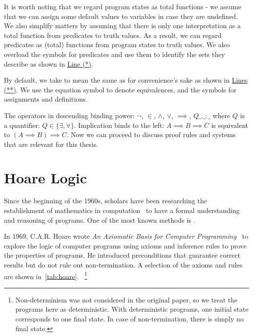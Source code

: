 It is worth noting that we regard program states as total functions - we assume that we can assign some default values to variables in case they are undefined. 
We also simplify matters by assuming that there is only one interpretation as a total function from predicates to truth values. 
As a result, we can regard predicates as (total) functions from program states to truth values. 
We also overload the symbols for predicates and use them to identify the sets they describe as shown in \hyperlink{2.*}{Line (*)}. 

By default, we take  to mean the same as  for convenience's sake as shown in \hyperlink{2.**}{Lines (**)}. 
We use the equation symbol \mathl{=} to denote equivalences, and the symbols \mathl{:=} for assignments and definitions. 

The operators in descending binding power: $\neg$, $\in$, $\wedge$, $\vee$, ${\implies}$, $Q\_.\_:\_$ where $Q$ is a quantifier: $Q\in\{\exists, \forall\}$. Implication binds to the left: $A{\implies} B{\implies} C$ is equivalent to $(A{\implies} B){\implies} C$.
Now we can proceed to discuss proof rules and systems that are relevant for this thesis. 




\section{Hoare Logic}\label{sec:hoare}
Since the beginning of the 1960s, scholars have been researching the establishment of mathematics in computation~\cite{floyd93, mccarthy93} to have a formal understanding and reasoning of programs. 
One of the most known methods is . 

In 1969, C.A.R. Hoare wrote \textit{An Axiomatic Basis for Computer Programming}~\cite{hoare69} to explore the logic of computer programs using axioms and inference rules to prove the properties of programs. 
He introduced  preconditions that  guarantee correct results but do not rule out non-termination. 
A selection of the axioms and rules are shown in~\autoref{tab:hoare}.~
\footnote{Non-determinism was not considered in the original paper, so we treat the programs here as deterministic. 
With deterministic programs, one initial state corresponds to one final state.
In case of non-termination, there is simply no final state. }

